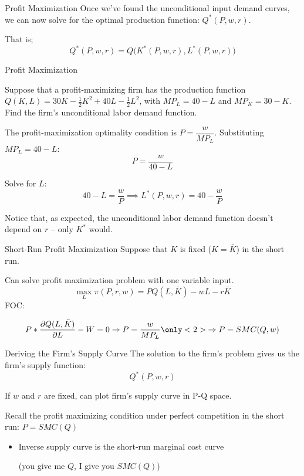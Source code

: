 \documentclass{beamer}
\begin{document}
\begin{frame}{Profit Maximization}
  Once we've found the unconditional input demand curves, we can now solve for the optimal production function: $Q^*(P,w,r)$.

  That is;
  $$
    Q^*(P,w,r) = Q\big( K^*(P,w,r), L^*(P,w,r) \big)
  $$
\end{frame}

\begin{frame}{Profit Maximization}

  Suppose that a profit-maximizing firm has the production function $Q(K,L) = 30K-\frac{1}{2}K^2+40L-\frac{1}{2}L^2$, with $MP_L = 40-L$ and $MP_K=30-K$.  Find the firm's unconditional labor demand function.
\end{frame}

\begin{frame}

  \bigskip
  The profit-maximization optimality condition is $P = \dfrac{w}{MP_L}$. Substituting $MP_L = 40-L$:
  $$
    P = \frac{w}{40-L}
  $$

  \bigskip
  Solve for $L$:
  $$
    40 - L = \frac{w}{P} \implies L^*(P,w,r) = 40 - \frac{w}{P}
  $$

  \bigskip
  Notice that, as expected, the unconditional labor demand function doesn't depend on $r$ -- only $K^*$ would.
\end{frame}


\begin{frame}{Short-Run Profit Maximization}
  Suppose that $K$ is fixed ($K = \bar{K}$) in the short run.

  Can solve profit maximization problem with one variable input.
  $$
    \max_{L}\pi(P,r,w) = PQ(L,\bar{K}) - wL - r\bar{K}
  $$
  FOC: 
  
  $$
    P * \frac{\partial Q(L, \bar{K})}{\partial L} - W = 0 \Rightarrow P = \frac{w}{MP_L} \only<2>{\Rightarrow P = SMC(Q,w)}
  $$

  \bigskip
\end{frame}

\begin{frame}{Deriving the Firm's Supply Curve}
  The solution to the firm's problem gives us the firm's supply function:
  $$
    Q^*(P,w,r)
  $$

  \bigskip
  If $w$ and $r$ are fixed, can plot firm's supply curve in P-Q space.

  \bigskip
  Recall the profit maximizing condition under perfect competition in the short run: $P = SMC(Q)$

  \begin{itemize}
    \item Inverse supply curve is the short-run marginal cost curve 
    
    (you give me $Q$, I give you $SMC(Q)$)
  \end{itemize}
\end{frame}
\end{document}
